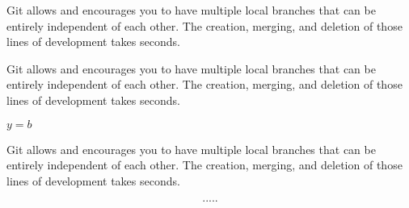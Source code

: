 Git allows and encourages you to have multiple local branches that can be entirely independent of each other. The creation, merging, and deletion of those lines of development takes seconds.


Git allows and encourages you to have multiple local branches that can be entirely independent of each other. The creation, merging, and deletion of those lines of development takes seconds.

$y=b$

Git allows and encourages you to have multiple local branches that can be entirely independent of each other. The creation, merging, and deletion of those lines of development takes seconds.

\begin{equation}.....\end{equation}
